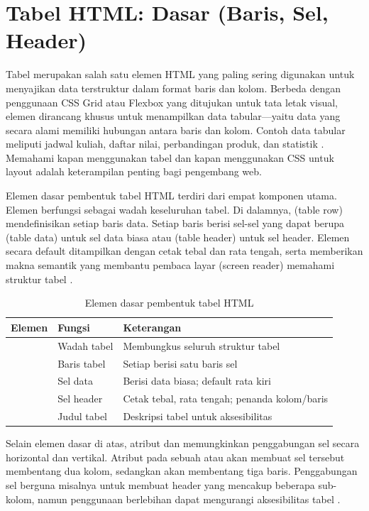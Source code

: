 \section{Tabel HTML: Dasar (Baris, Sel, Header)}

Tabel merupakan salah satu elemen HTML yang paling sering digunakan untuk menyajikan data terstruktur dalam format baris dan kolom. Berbeda dengan penggunaan CSS Grid atau Flexbox yang ditujukan untuk tata letak visual, elemen  dirancang khusus untuk menampilkan data tabular---yaitu data yang secara alami memiliki hubungan antara baris dan kolom. Contoh data tabular meliputi jadwal kuliah, daftar nilai, perbandingan produk, dan statistik \cite{mdnHtmlIntro}. Memahami kapan menggunakan tabel dan kapan menggunakan CSS untuk layout adalah keterampilan penting bagi pengembang web.

Elemen dasar pembentuk tabel HTML terdiri dari empat komponen utama. Elemen  berfungsi sebagai wadah keseluruhan tabel. Di dalamnya,  (table row) mendefinisikan setiap baris data. Setiap baris berisi sel-sel yang dapat berupa  (table data) untuk sel data biasa atau  (table header) untuk sel header. Elemen  secara default ditampilkan dengan cetak tebal dan rata tengah, serta memberikan makna semantik yang membantu pembaca layar (screen reader) memahami struktur tabel \cite{webdevHtml}.

\begin{table}[htbp]
\centering
\begin{tabular}{|P{2.5cm}|P{4cm}|P{5.5cm}|}
\hline
\textbf{Elemen} & \textbf{Fungsi} & \textbf{Keterangan} \\
\hline
{} & Wadah tabel & Membungkus seluruh struktur tabel \\
\hline
{} & Baris tabel & Setiap  berisi satu baris sel \\
\hline
{} & Sel data & Berisi data biasa; default rata kiri \\
\hline
{} & Sel header & Cetak tebal, rata tengah; penanda kolom/baris \\
\hline
{} & Judul tabel & Deskripsi tabel untuk aksesibilitas \\
\hline
\end{tabular}
\caption{Elemen dasar pembentuk tabel HTML}
\end{table}

Selain elemen dasar di atas, atribut  dan  memungkinkan penggabungan sel secara horizontal dan vertikal. Atribut  pada sebuah  atau  akan membuat sel tersebut membentang dua kolom, sedangkan  akan membentang tiga baris. Penggabungan sel berguna misalnya untuk membuat header yang mencakup beberapa sub-kolom, namun penggunaan berlebihan dapat mengurangi aksesibilitas tabel \cite{mdnAccessibility}.

